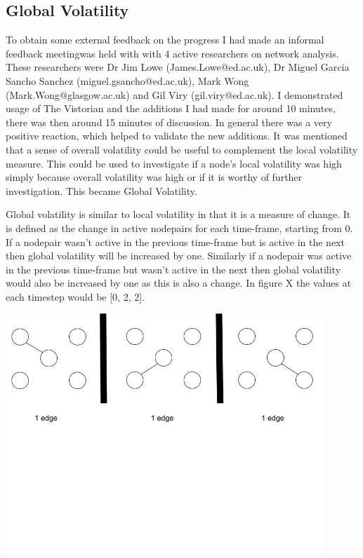 
\subsection{Global Volatility}

To obtain some external feedback on the progress I had made an informal feedback meetingwas held with with 4 active researchers on network analysis. These researchers were Dr Jim Lowe (James.Lowe@ed.ac.uk), Dr Miguel Garcia Sancho Sanchez (miguel.gsancho@ed.ac.uk), Mark Wong (Mark.Wong@glasgow.ac.uk) and Gil Viry (gil.viry@ed.ac.uk). I demonstrated usage of The Vistorian and the additions I had made for around 10 minutes, there was then around 15 minutes of discussion. In general there was a very positive reaction, which helped to validate the new additions. It was mentioned that a sense of overall volatility could be useful to complement the local volatility measure. This could be used to investigate if a node's local volatility was high simply because overall volatility was high or if it is worthy of further investigation. This became Global Volatility.

Global volatility is similar to local volatility in that it is a measure of change. It is defined as the change in active nodepairs for each time-frame, starting from 0. If a nodepair wasn't active in the previous time-frame but is active in the next then global volatility will be increased by one. Similarly if a nodepair was active in the previous time-frame but wasn't active in the next then global volatility would also be increased by one as this is also a change. In figure X the values at each timestep would be [0, 2, 2].

\begin{center}
\includegraphics[trim={0 10cm 0 -1cm}, width=120mm]{./Figures/volatility3.jpg}
\end{center}



